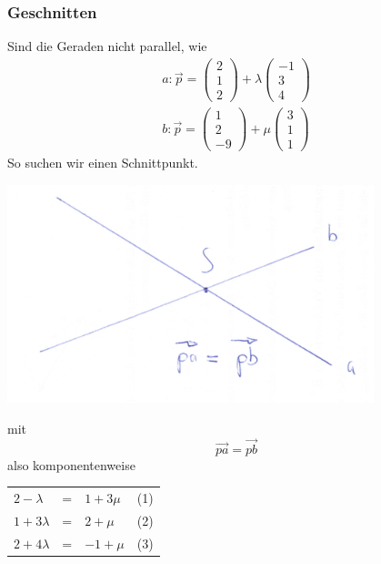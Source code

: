 \subsubsection{Geschnitten}
Sind die Geraden nicht parallel, wie 
\begin{eqnarray*}
	a: \vec{p} = \begin{pmatrix}2\\1\\2\end{pmatrix}+ \lambda \begin{pmatrix}-1\\3\\4\end{pmatrix}\\
	b: \vec{p} = \begin{pmatrix}1\\2\\-9\end{pmatrix} + \mu \begin{pmatrix}3\\1\\1\end{pmatrix}
\end{eqnarray*}
So suchen wir einen Schnittpunkt.\\
\begin{center}
	 \includegraphics[width=0.8\textwidth]{imgs/schnittpunkt_vektoren.png}
 \end{center}
mit
\begin{equation*}
	\vec{pa} = \vec{pb}
\end{equation*}
also komponentenweise
\begin{center}
	\begin{tabular}{|lll|l}
		$2 - \lambda 	$&=&$ 1 + 3\mu$&(1)\\
		$1 + 3\lambda $&=&$ 2 + \mu$&(2)\\
		$2 + 4 \lambda $&=&$ -1 + \mu$&(3)
	\end{tabular}
\end{center}

